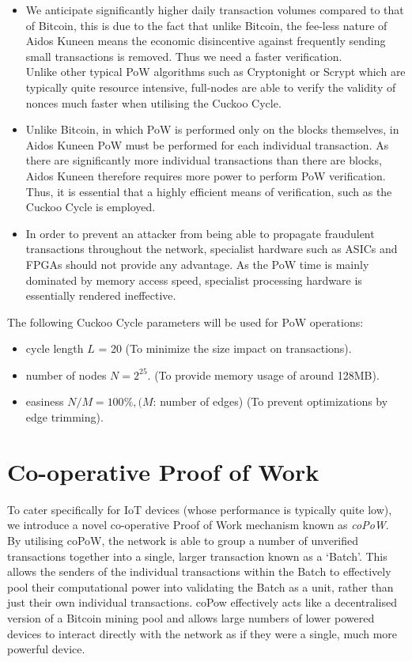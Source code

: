 \documentclass[a4paper,10pt,twocolumn]{article}
\begin{document}
\begin{itemize}
	\item We anticipate significantly higher daily transaction volumes compared to that of Bitcoin, this is due to the fact that unlike Bitcoin, the fee-less nature of Aidos Kuneen means the economic disincentive against frequently sending small transactions is removed. Thus we need a faster verification. \\
Unlike other typical PoW algorithms such as Cryptonight or Scrypt which are typically quite resource intensive, full-nodes are able to verify the validity of nonces much faster when utilising the Cuckoo Cycle. 

\item Unlike Bitcoin, in which PoW is performed only on the blocks themselves, in Aidos Kuneen PoW must be performed for each individual transaction. As there are significantly more individual transactions than there are blocks, Aidos Kuneen therefore requires more power to perform PoW verification. Thus, it is essential that a highly efficient means of verification, such as the Cuckoo Cycle is employed.

\item In order to prevent an attacker from being able to propagate fraudulent transactions throughout the network, specialist hardware such as ASICs and FPGAs should not provide any advantage. As the PoW time is mainly dominated by memory access speed, specialist processing hardware is essentially rendered ineffective.
\end{itemize}

The following Cuckoo Cycle parameters will be used for PoW operations:

\begin{itemize}
	\item cycle length \( L\) = 20 (To minimize the size impact on transactions).
    \item number of nodes \( N = 2^{25} \). (To provide memory usage of around 128MB\@).
    \item easiness \(N/M = 100\% , (M\): number of edges) (To prevent optimizations by edge trimming).
\end{itemize}

\section{Co-operative Proof of Work}
\label{sec:coPoW}

To cater specifically for IoT devices (whose performance is typically quite low), we introduce a novel co-operative Proof of Work 
mechanism known as \emph{coPoW}. By utilising coPoW, the network is able to group a number of unverified transactions together into a 
single, larger transaction known as a `Batch'. This allows the senders of the individual transactions within the Batch to effectively 
pool their computational power into validating the Batch as a unit, rather than just their own individual transactions.
coPow effectively acts like a decentralised version of a Bitcoin mining pool and allows large numbers of lower powered devices to interact directly with the network as if they were a single, much more powerful device.
\end{document}
